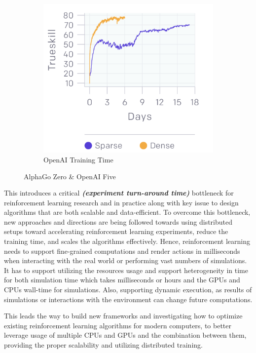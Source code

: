 \begin{figure}[!htb]
\begin{subfigure}[b]{0.3\textwidth}
		\includegraphics[width=\textwidth]{figures/rl/openai_five_time.png}
		\caption{OpenAI Training Time}
		\label{fig:openai_five_time}
	\end{subfigure}
	\hfill
	\caption{AlphaGo Zero \& OpenAI Five}
	\label{fig:zero_and_five}
\end{figure}

This introduces a critical \textit{\textbf{(experiment turn-around time)}} bottleneck for reinforcement learning research and in practice along with key issue to design algorithms that are both scalable and data-efficient. To overcome this bottleneck, new approaches and directions are being followed towards using distributed setups toward accelerating reinforcement learning experiments, reduce the training time, and scales the algorithms effectively. Hence, reinforcement learning needs to support fine-grained computations and render actions in milliseconds when interacting with the real world or performing vast numbers of simulations. It has to support utilizing the resources usage and support heterogeneity in time for both simulation time which takes milliseconds or hours and the GPUs and CPUs wall-time for simulations. Also, supporting dynamic execution, as results of simulations or interactions with the environment can change future computations. 

This leads the way to build new frameworks and investigating how to optimize existing reinforcement learning algorithms for modern computers, to better leverage usage of multiple CPUs and GPUs and the combination between them, providing the proper scalability and utilizing distributed training.

